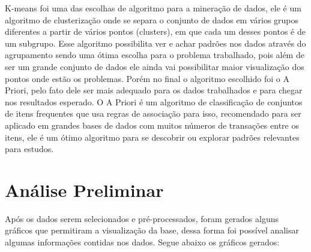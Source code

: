 \documentclass[tcc1]{uftex}
\begin{document}
	
	K-means foi uma das escolhas de algoritmo para a mineração de dados, ele é um algoritmo de clusterização onde se separa o conjunto de dados em vários grupos diferentes a partir de vários pontos (clusters), em que cada um desses pontos é de um subgrupo. Esse algoritmo possibilita ver e achar padrões nos dados através do agrupamento sendo uma ótima escolha para o problema trabalhado, pois além de ser um grande conjunto de dados ele ainda vai possibilitar maior visualização dos pontos onde estão os problemas.\cite{kmeans} Porém no final o algoritmo escolhido foi o A Priori, pelo fato dele ser mais adequado para os dados trabalhados e para chegar nos resultados esperado. O A Priori é um algoritmo de classificação de conjuntos de itens frequentes que usa regras de associação para isso, recomendado para ser aplicado em grandes bases de dados com muitos números de transações entre os itens, ele é um ótimo algoritmo para se descobrir ou explorar padrões relevantes para estudos.\cite{agrawal1993mining}







\chapter{Análise Preliminar}

Após os dados serem selecionados e pré-processados, foram gerados alguns gráficos que permitiram a visualização da base, dessa forma foi possível analisar algumas informações contidas nos dados. Segue abaixo os gráficos gerados:
\end{document}
